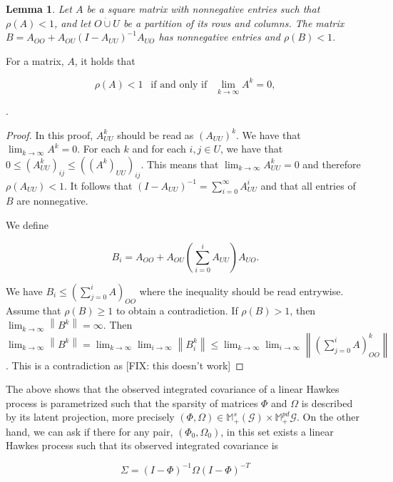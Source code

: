 \documentclass[accepted]{uai2021} %
\newtheorem{lem}[thm]{Lemma}
\newcommand{\disjU}{\mathbin{\dot{\cup}}}
\newcommand{\norm}[1]{\left\lVert#1\right\rVert}
\begin{document}
\begin{lem}
	Let $A$ be a square matrix with nonnegative entries such that $\rho(A)<1$, 
	and let $O\disjU U$ be a partition of its rows and columns. The matrix 
	$B=A_{OO} + 
	A_{OU}(I-A_{UU})^{-1}A_{UO}$ has nonnegative entries and  
	$\rho(B)<1$.
	\label{lem:margStab}
	\end{lem}
	
	For a matrix, $A$, it holds that
	
	$$
	\rho(A) < 1 \ \  \text{   if and only if   } \ \ \lim_{k\rightarrow \infty} 
	A^k = 0,
	$$
	
	\citep[Theorem 5.6.12]{horn1985}.
	
	\begin{proof}
		In this proof, $A_{UU}^k$ should be read as $(A_{UU})^k$.
		We have that $\lim_{k\rightarrow\infty} A^k = 0$. For each $k$ and for 
		each $i,j\in U$, we have that $0 \leq (A_{UU}^k)_{ij} \leq 
		((A^k)_{UU})_{ij}$. This means that $\lim_{k\rightarrow\infty} A_{UU}^k 
		= 0$ and therefore $\rho(A_{UU}) < 1$. It follows that 
		$(I-A_{UU})^{-1} = \sum_{i=0}^\infty A_{UU}^i$ and that all entries of 
		$B$ are nonnegative.
		
		We define 
		
		$$
		B_i = A_{OO} + A_{OU}\left( \sum_{i = 0}^{i} A_{UU} \right) A_{UO}.
		$$			
		
		We have $B_i \leq (\sum_{j = 0}^{i} A)_{OO} $ where the inequality 
		should 
		be read 
		entrywise. Assume that $\rho(B) \geq 1$ to obtain a contradiction. If 
		$\rho(B) > 1$, then $\lim_{k \rightarrow \infty} \norm{B^k} = 
		\infty$. Then $\lim_{k \rightarrow \infty} \norm{B^k} = \lim_{k 
		\rightarrow \infty} \lim_{i \rightarrow \infty} \norm{B_i^k} \leq 
		\lim_{k 
		\rightarrow \infty} \lim_{i \rightarrow \infty} \norm{(\sum_{j = 0}^{i} 
		A)_{OO}^k}$. This is a contradiction as [FIX: this doesn't work]
		
						\end{proof}
		
		The above shows that the observed integrated covariance of a linear 
		Hawkes process is parametrized such that the sparsity of matrices 
		$\Phi$ and $\Omega$ is described by its latent projection, more 
		precisely $(\Phi,\Omega) \in \mathbb{M}_{+}^s(\mathcal{G})\times 
		\mathbb{M}_+^{pd}\mathcal{G}$. On the other hand, we can ask if there 
		for any pair, $(\Phi_0,\Omega_0)$, in this set exists a linear Hawkes 
		process such that its observed integrated covariance is
		
		$$
		\Sigma = (I - \Phi)^{-1}\Omega (I - \Phi)^{-T}
		$$
		
\end{document}
